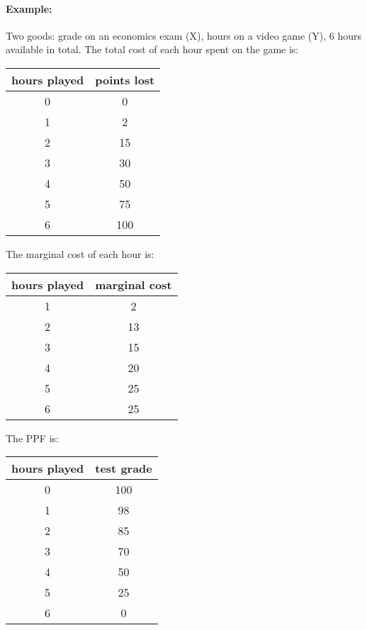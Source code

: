 \documentclass{article}
\begin{document}
\paragraph{Example:} Two goods: grade on an economics exam (X), hours on a
video game (Y), 6 hours available in total. The total cost of each hour spent
on the game is:
\begin{center}
  \begin{tabular}{|c|c|}
    \hline
    hours played & points lost \\ \hline
    0 & 0 \\ \hline
    1 & 2 \\ \hline
    2 & 15 \\ \hline
    3 & 30 \\ \hline
    4 & 50 \\ \hline
    5 & 75 \\ \hline
    6 & 100 \\ \hline
  \end{tabular}
\end{center}

The marginal cost of each hour is:
\begin{center}
  \begin{tabular}{|c|c|}
    \hline
    hours played & marginal cost \\ \hline
    1 & 2 \\ \hline
    2 & 13 \\ \hline
    3 & 15 \\ \hline
    4 & 20 \\ \hline
    5 & 25 \\ \hline
    6 & 25 \\ \hline
  \end{tabular}
\end{center}

The PPF is:
\begin{center}
  \begin{tabular}{|c|c|}
    \hline
    hours played & test grade \\ \hline
    0 & 100 \\ \hline
    1 & 98 \\ \hline
    2 & 85 \\ \hline
    3 & 70 \\ \hline
    4 & 50 \\ \hline
    5 & 25 \\ \hline
    6 & 0 \\ \hline
  \end{tabular}
\end{center}
\end{document}
